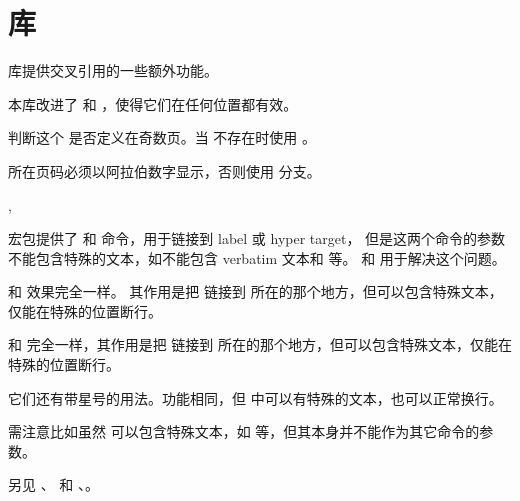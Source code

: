 \documentclass{cusdoc}
\begin{document}
\section{库}\label{sec:lib-ref}

 库提供交叉引用的一些额外功能。

本库改进了  和 ，使得它们在任何位置都有效。

\begin{function}{\IfLabelOdd}
  \begin{syntax}
    \V\IfLabelOdd {}  
  \end{syntax}
判断这个  是否定义在奇数页。当  不存在时使用 。

 所在页码必须以阿拉伯数字显示，否则使用  分支。
\end{function}

\begin{function}{\HyperRef,\HyperLink}
  \begin{syntax}
    \V\HyperRef   {} 
    \V\HyperRef *  
    \V\HyperLink   {} 
    \V\HyperLink *  
  \end{syntax}
 宏包提供了  和  命令，用于链接到 label 或 hyper target，
但是这两个命令的参数不能包含特殊的文本，如不能包含 verbatim 文本和  等。
 和  用于解决这个问题。

 和  效果完全一样。
其作用是把  链接到  所在的那个地方，但可以包含特殊文本，仅能在特殊的位置断行。

 和 
完全一样，其作用是把  链接到  所在的那个地方，但可以包含特殊文本，仅能在特殊的位置断行。

它们还有带星号的用法。功能相同，但  中可以有特殊的文本，也可以正常换行。

需注意比如虽然  可以包含特殊文本，如  等，但其本身并不能作为其它命令的参数。

另见 、 和 
、。
\end{function}
\end{document}
